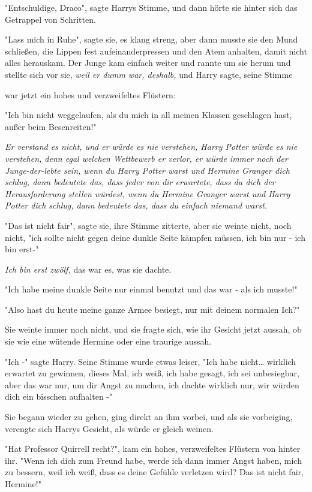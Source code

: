 {"Entschuldige, Draco", sagte Harrys Stimme, und dann hörte sie hinter sich das Getrappel von Schritten.

"Lass mich in Ruhe", sagte sie, es klang streng, aber dann musste sie den Mund schließen, die Lippen fest aufeinanderpressen und den Atem anhalten, damit nicht alles herauskam. Der Junge kam einfach weiter und rannte um sie herum und stellte sich vor sie, \emph{weil er dumm war, deshalb,} und Harry sagte, seine Stimme

war jetzt ein hohes und verzweifeltes Flüstern:

"Ich bin nicht weggelaufen, als du mich in all meinen Klassen geschlagen hast, außer beim Besenreiten!"

\emph{Er verstand es nicht, und er würde es nie verstehen, Harry Potter würde es nie verstehen, denn egal welchen Wettbewerb er verlor, er würde immer noch der Junge-der-lebte sein, wenn du Harry Potter warst und Hermine Granger dich schlug, dann bedeutete das, dass jeder von dir erwartete, dass du dich der Herausforderung stellen würdest, wenn du Hermine Granger warst und Harry Potter dich schlug, dann bedeutete das, dass du einfach niemand warst.}

"Das ist nicht fair", sagte sie, ihre Stimme zitterte, aber sie weinte nicht, noch nicht, "ich sollte nicht gegen deine dunkle Seite kämpfen müssen, ich bin nur - ich bin erst-"

\emph{Ich bin erst zwölf,} das war es, was sie dachte.

"Ich habe meine dunkle Seite nur einmal benutzt und das war - als ich musste!"

"Also hast du heute meine ganze Armee besiegt, nur mit deinem normalen Ich?"

Sie weinte immer noch nicht, und sie fragte sich, wie ihr Gesicht jetzt aussah, ob sie wie eine wütende Hermine oder eine traurige aussah.

"Ich -" sagte Harry. Seine Stimme wurde etwas leiser, "Ich habe nicht… wirklich erwartet zu gewinnen, dieses Mal, ich weiß, ich habe gesagt, ich sei unbesiegbar, aber das war nur, um dir Angst zu machen, ich dachte wirklich nur, wir würden dich ein bisschen aufhalten -"

Sie begann wieder zu gehen, ging direkt an ihm vorbei, und als sie vorbeiging, verengte sich Harrys Gesicht, als würde er gleich weinen.

"Hat Professor Quirrell recht?", kam ein hohes, verzweifeltes Flüstern von hinter ihr. "Wenn ich dich zum Freund habe, werde ich dann immer Angst haben, mich zu bessern, weil ich weiß, dass es deine Gefühle verletzen wird? Das ist nicht fair, Hermine!"

}

